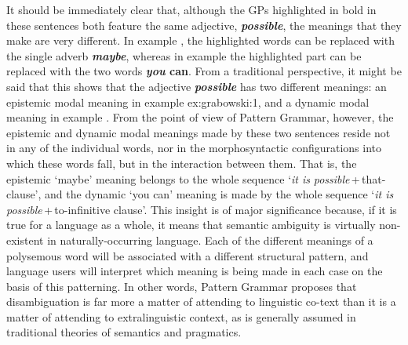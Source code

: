 \documentclass[output=paper]{langscibook}
\begin{document}
It should be immediately clear that, although the GPs highlighted in bold in these sentences both feature the same adjective, \textbf{\textit{possible}}, the meanings that they make are very different. In example , the highlighted words can be replaced with the single adverb \textbf{\textit{maybe}}, whereas in example  the highlighted part can be replaced with the two words \textbf{\textit{you} \textbf{can}}. From a traditional perspective, it might be said that this shows that the adjective \textbf{\textit{possible}} has two different meanings: an epistemic modal meaning in example {ex:grabowski:1}, and a dynamic modal meaning in example . From the point of view of Pattern Grammar, however, the epistemic and dynamic modal meanings made by these two sentences reside not in any of the individual words, nor in the morphosyntactic configurations into which these words fall, but in the interaction between them. That is, the epistemic ‘maybe’ meaning belongs to the whole sequence ‘\textit{it is} \textit{possible}\,+\,that-clause’, and the dynamic ‘you can’ meaning is made by the whole sequence ‘\textit{it is} \textit{possible}\,+\,to-infinitive clause’. This insight is of major significance because, if it is true for a language as a whole, it means that semantic ambiguity is virtually non-existent in naturally-occurring language. Each of the different meanings of a polysemous word will be associated with a different structural pattern, and language users will interpret which meaning is being made in each case on the basis of this patterning. In other words, Pattern Grammar proposes that disambiguation is far more a matter of attending to linguistic co-text than it is a matter of attending to extralinguistic context, as is generally assumed in traditional theories of semantics and pragmatics.
\end{document}
